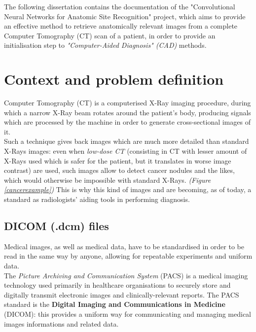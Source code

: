 \documentclass[../main.tex]{subfiles}
\begin{document}
\thispagestyle{empty}

The following dissertation contains the documentation of the "Convolutional Neural Networks for Anatomic Site Recognition" project, which aims to provide an effective method to retrieve anatomically relevant images from a complete Computer Tomography (CT) scan of a patient, in order to provide an initialisation step to \textit{"Computer-Aided Diagnosis" (CAD)} methods.

\section{Context and problem definition}

Computer Tomography (CT) is a computerised X-Ray imaging procedure, during which a narrow X-Ray beam rotates around the patient's body, producing signals which are processed by the machine in order to generate cross-sectional images of it. \\
Such a technique gives back images which are much more detailed than standard X-Rays images: even when \textit{low-dose CT} (consisting in CT with lesser amount of X-Rays used which is safer for the patient, but it translates in worse image contrast) are used, such images allow to detect cancer nodules and the likes, which would otherwise be impossible with standard X-Rays. \textit{(Figure \ref{cancerexample})} This is why this kind of images and are becoming, as of today, a standard as radiologists' aiding tools in performing diagnosis.\cite{Indicators2017} 


\vspace{5mm}
\subsection{DICOM (.dcm) files} %
Medical images, as well as medical data, have to be standardised in order to be read in the same way by anyone, allowing for repeatable experiments and uniform data. \\
The \textit{Picture Archiving and Communication System} (PACS) is a medical imaging technology used primarily in healthcare organisations to securely store and digitally transmit electronic images and clinically-relevant reports. The PACS standard is the \textbf{Digital Imaging and Communications in Medicine} (DICOM): this provides a uniform way for communicating and managing medical images informations and related data.
\end{document}
